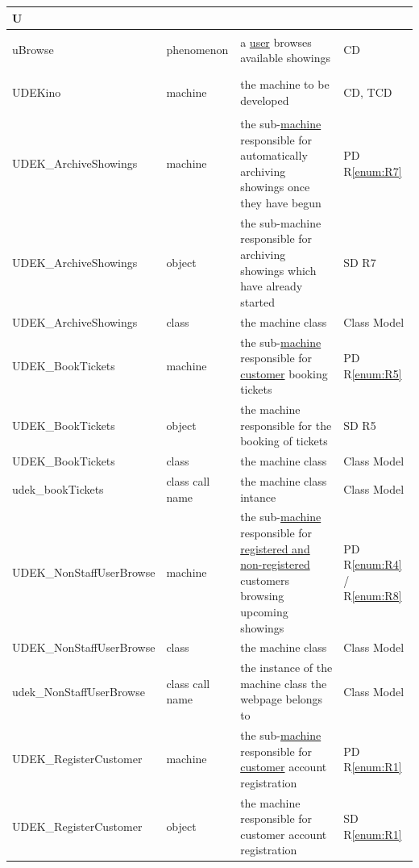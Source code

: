 \documentclass[a4paper,10pt,titlepage,bibtotoc,bibtotocnumbered]{scrreprt}
\begin{document}
\begin{longtable}{|p{.4\linewidth}|p{.2\linewidth}|p{.2\linewidth}|p{.2\linewidth}|}
\hline
\multicolumn{4}{|l|}{\textbf{U}}\\
\hline
\hypertarget{glossary:uBrowse}{uBrowse} & phenomenon & a \hyperlink{glossary:User}{user} browses available showings & CD\\
\hline
\hypertarget{glossary:UDEKino}{UDEKino} & machine & the machine to be developed & CD, TCD\\
\hline
\hypertarget{glossary:UDEK-ArchiveShowings}{UDEK\_ArchiveShowings} & machine & the sub-\hyperlink{glossary:UDEKino}{machine} responsible for automatically archiving showings once they have begun & PD R\ref{enum:R7} \\
\hline
UDEK\_ArchiveShowings & object & the sub-machine responsible for archiving showings which have already started & SD R7\\
\hline
UDEK\_ArchiveShowings & class & the machine class & Class Model\\
\hline
\hypertarget{glossary:UDEK-BookTickets}{UDEK\_BookTickets} & machine & the sub-\hyperlink{glossary:UDEKino}{machine} responsible for \hyperlink{glossary:Customer}{customer} booking tickets & PD R\ref{enum:R5}\\
\hline
UDEK\_BookTickets & object & the machine responsible for the booking of tickets & SD R5\\
\hline
UDEK\_BookTickets & class & the machine class & Class Model\\
\hline
udek\_bookTickets & class call name & the machine class intance & Class Model\\
\hline
\hypertarget{glossary:UDEK-NonStaffUserBrowse}{UDEK\_NonStaffUserBrowse} & machine & the sub-\hyperlink{glossary:UDEKino}{machine} responsible for \hyperlink{glossary:NonStaffUser}{registered and non-registered} customers browsing upcoming showings & PD R\ref{enum:R4} / R\ref{enum:R8}\\
\hline
UDEK\_NonStaffUserBrowse & class & the machine class & Class Model\\
\hline
udek\_NonStaffUserBrowse & class call name & the instance of the machine class the webpage belongs to & Class Model\\
\hline
\hypertarget{glossary:UDEK-RegisterCustomer}{UDEK\_RegisterCustomer} & machine & the sub-\hyperlink{glossary:UDEKino}{machine} responsible for \hyperlink{glossary:Customer}{customer} account registration & PD R\ref{enum:R1}\\
\hline
UDEK\_RegisterCustomer & object & the machine responsible for customer account registration & SD R\ref{enum:R1}\\

\end{longtable}
\end{document}
